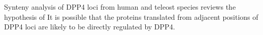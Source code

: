 Synteny analysis of DPP4 loci from human and teleost species reviews the hypothesis of 
It is possible that the proteins translated from adjacent positions of DPP4 loci are likely to be directly regulated by DPP4. 
